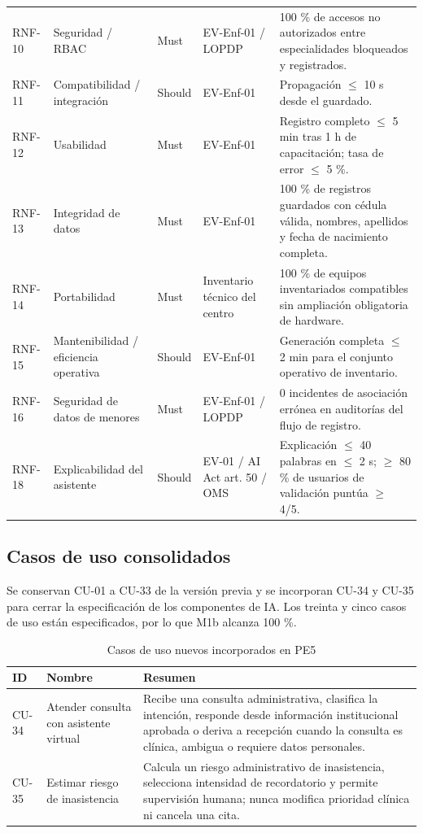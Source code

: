 \documentclass[11pt,a4paper]{article}
\begin{document}
\begin{longtable}{p{1.5cm}p{2.98cm}p{1.5cm}p{2.8cm}p{6.4cm}}
		RNF-10 & Seguridad / RBAC & Must & EV-Enf-01 / LOPDP & 100 \% de accesos no autorizados entre especialidades bloqueados y registrados. \\
		RNF-11 & Compatibilidad / integración & Should & EV-Enf-01 & Propagación $\leq$ 10 s desde el guardado. \\
		RNF-12 & Usabilidad & Must & EV-Enf-01 & Registro completo $\leq$ 5 min tras 1 h de capacitación; tasa de error $\leq$ 5 \%. \\
		RNF-13 & Integridad de datos & Must & EV-Enf-01 & 100 \% de registros guardados con cédula válida, nombres, apellidos y fecha de nacimiento completa. \\
		RNF-14 & Portabilidad & Must & Inventario técnico del centro & 100 \% de equipos inventariados compatibles sin ampliación obligatoria de hardware. \\
		RNF-15 & Mantenibilidad / eficiencia operativa & Should & EV-Enf-01 & Generación completa $\leq$ 2 min para el conjunto operativo de inventario. \\
		RNF-16 & Seguridad de datos de menores & Must & EV-Enf-01 / LOPDP & 0 incidentes de asociación errónea en auditorías del flujo de registro. \\
		RNF-18 & Explicabilidad del asistente & Should & EV-01 / AI Act art. 50 / OMS & Explicación $\leq$ 40 palabras en $\leq$ 2 s; $\geq$ 80 \% de usuarios de validación puntúa $\geq$ 4/5. \\
		\bottomrule\end{longtable}
	\subsection{Casos de uso consolidados}
	Se conservan CU-01 a CU-33 de la versión previa y se incorporan CU-34 y CU-35 para cerrar la especificación de los componentes de IA. Los treinta y cinco casos de uso están especificados, por lo que M1b alcanza 100 \%.
	\begin{longtable}{p{2cm}p{5.2cm}p{8.2cm}}
		\caption{Casos de uso nuevos incorporados en PE5}\label{tab:cunuevos}\\\toprule
		\textbf{ID}&\textbf{Nombre}&\textbf{Resumen}\\\midrule\endhead
		CU-34&Atender consulta con asistente virtual&Recibe una consulta administrativa, clasifica la intención, responde desde información institucional aprobada o deriva a recepción cuando la consulta es clínica, ambigua o requiere datos personales.\\
		CU-35&Estimar riesgo de inasistencia&Calcula un riesgo administrativo de inasistencia, selecciona intensidad de recordatorio y permite supervisión humana; nunca modifica prioridad clínica ni cancela una cita.\\\bottomrule
	\end{longtable}
	
\end{document}
